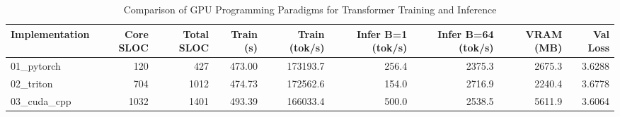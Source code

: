 \begin{table}[htbp]
\centering
\caption{Comparison of GPU Programming Paradigms for Transformer Training and Inference}
\label{tab:benchmark_summary}
\begin{tabular}{lrrrrrrrr}
\hline
Implementation & Core SLOC & Total SLOC & Train (s) & Train (tok/s) & Infer B=1 (tok/s) & Infer B=64 (tok/s) & VRAM (MB) & Val Loss \\
\hline
01\_pytorch & 120 & 427 & 473.00 & 173193.7 & 256.4 & 2375.3 & 2675.3 & 3.6288 \\
02\_triton & 704 & 1012 & 474.73 & 172562.6 & 154.0 & 2716.9 & 2240.4 & 3.6778 \\
03\_cuda\_cpp & 1032 & 1401 & 493.39 & 166033.4 & 500.0 & 2538.5 & 5611.9 & 3.6064 \\
\hline
\end{tabular}
\end{table}
